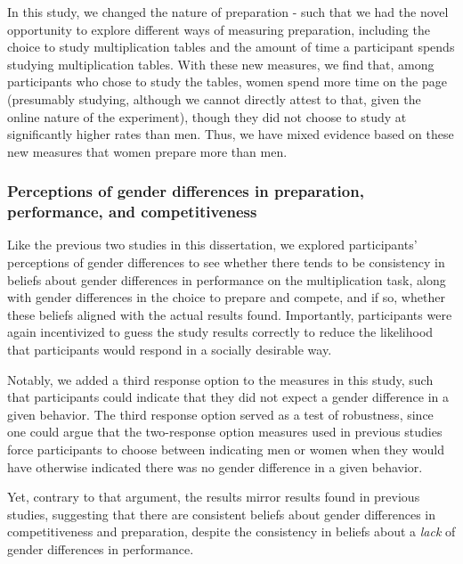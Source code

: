 \documentclass[a4paper, nobind]{templates/ociamthesis}
\begin{document}
In this study, we changed the nature of preparation - such that we had the novel opportunity to explore different ways of measuring preparation, including the choice to study multiplication tables and the amount of time a participant spends studying multiplication tables. With these new measures, we find that, among participants who chose to study the tables, women spend more time on the page (presumably studying, although we cannot directly attest to that, given the online nature of the experiment), though they did not choose to study at significantly higher rates than men. Thus, we have mixed evidence based on these new measures that women prepare more than men.

\hypertarget{perceptions-of-gender-differences-in-preparation-performance-and-competitiveness-4}{%
\subsubsection{Perceptions of gender differences in preparation, performance, and competitiveness}\label{perceptions-of-gender-differences-in-preparation-performance-and-competitiveness-4}}

Like the previous two studies in this dissertation, we explored participants' perceptions of gender differences to see whether there tends to be consistency in beliefs about gender differences in performance on the multiplication task, along with gender differences in the choice to prepare and compete, and if so, whether these beliefs aligned with the actual results found. Importantly, participants were again incentivized to guess the study results correctly to reduce the likelihood that participants would respond in a socially desirable way.

Notably, we added a third response option to the measures in this study, such that participants could indicate that they did not expect a gender difference in a given behavior. The third response option served as a test of robustness, since one could argue that the two-response option measures used in previous studies force participants to choose between indicating men or women when they would have otherwise indicated there was no gender difference in a given behavior.

Yet, contrary to that argument, the results mirror results found in previous studies, suggesting that there are consistent beliefs about gender differences in competitiveness and preparation, despite the consistency in beliefs about a \emph{lack} of gender differences in performance.
\end{document}
